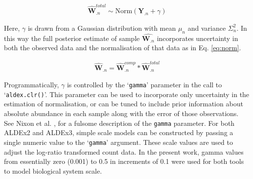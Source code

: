 \documentclass[10pt,letterpaper]{article}
\begin{document}
\begin{eqnarray}
	\label{eq:adaptation}
	\hat{\mathbf{W}}^{total}_{.n} \sim \mathrm{Norm}(\mathbf{Y}_{.n} + \gamma)
\end{eqnarray}

Here, $\gamma$ is drawn from a Gaussian distribution with mean $\mu_n$ and variance $\Sigma^2_n$. In this way the full posterior estimate of sample  $\hat{\mathbf{W}_{.n}}$ incorporates uncertainty in both the observed data and the normalisation of that data as in Eq. \ref{eq:norm}.

\begin{eqnarray}
	\label{eq:norm}
	\hat{\mathbf{W}}_{.n} = \hat{\mathbf{W}}^{comp}_{.n} * \hat{\mathbf{W}}^{total}_{.n}
\end{eqnarray}


Programmatically, $\gamma$  is controlled by the `\texttt{gamma}' parameter in the call to `\texttt{aldex.clr()}'. This parameter can be used to incorporate only uncertainty in the estimation of normalisation, or can be tuned to include prior information about absolute abundance in each sample along with the error of those observations. See Nixon et al. \cite{nixon_incorporating_2025}, for a fulsome description of the \texttt{gamma} parameter. For both ALDEx2 and ALDEx3, simple scale models can be constructed by passing a single numeric value to the `\texttt{gamma}' argument. These scale values are used to adjust the log-ratio transformed count data. In the present work, gamma values from essentially zero (0.001) to 0.5 in increments of 0.1 were used for both tools to model biological system scale.


\end{document}

